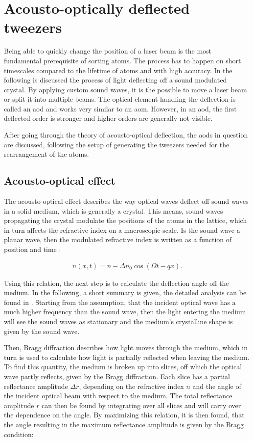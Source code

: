 \section{Acousto-optically deflected tweezers}

Being able to quickly change the position of a laser beam is the most fundamental prerequisite of sorting atoms. The process has to happen on short timescales compared to the lifetime of atoms and with high accuracy. In the following is discussed the process of light deflecting off a sound modulated crystal. By applying custom sound waves, it is the possible to move a laser beam or split it into multiple beams. The optical element handling the deflection is called an \ac{aod} and works very similar to an \ac{aom}. However, in an \ac{aod}, the first deflected order is stronger and higher orders are generally not visible.

After going through the theory of acousto-optical deflection, the \acp{aod} in question are discussed, following the setup of generating the tweezers needed for the rearrangement of the atoms.

\subsection{Acousto-optical effect}

The acousto-optical effect describes the way optical waves deflect off sound waves in a solid medium, which is generally a crystal. This means, sound waves propagating the crystal modulate the positions of the atoms in the lattice, which in turn affects the refractive index on a macroscopic scale. Is the sound wave a planar wave, then the modulated refractive index is written as a function of position and time \cite{Saleh1991}:

\begin{align}
	n(x, t) = n - \Delta n_0 \cos{\left(\Omega t - q x\right)}.
\end{align}

Using this relation, the next step is to calculate the deflection angle off the medium. In the following, a short summary is given, the detailed analysis can be found in \cite{Saleh1991}. Starting from the assumption, that the incident optical wave has a much higher frequency than the sound wave, then the light entering the medium will see the sound waves as stationary and the medium's crystalline shape is given by the sound wave.

Then, Bragg diffraction describes how light moves through the medium, which in turn is used to calculate how light is partially reflected when leaving the medium. To find this quantity, the medium is broken up into slices, off which the optical wave partly reflects, given by the Bragg diffraction. Each slice has a partial reflectance amplitude $\Delta r$, depending on the refractive index $n$ and the angle of the incident optical beam with respect to the medium. The total reflectance amplitude $r$ can then be found by integrating over all slices and will carry over the dependence on the angle. By maximizing this relation, it is then found, that the angle resulting in the maximum reflectance amplitude is given by the Bragg condition:

